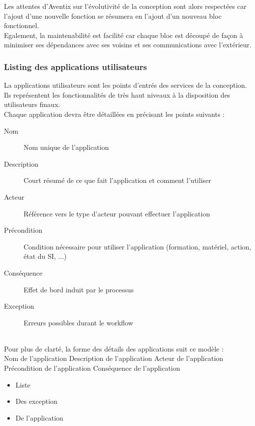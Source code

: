Les attentes d'Aventix sur l'évolutivité de la conception sont alors respectées
car l'ajout d'une nouvelle fonction se résumera en l'ajout d'un nouveau bloc
fonctionnel. \\

Egalement, la maintenabilité est facilité car chaque bloc est découpé de façon
à minimiser ses dépendances avec ses voisins et ses communications avec
l'extérieur. \\


\subsubsection{Listing des applications utilisateurs}
La applications utilisateurs sont les points d'entrés des services de la
conception. Ils représentent les fonctionnalités de très haut niveaux à la
disposition des utilisateurs finaux. \\

Chaque application devra être détaillées en précisant les points suivants :
\begin{description}
  \item[Nom] Nom unique de l'application
  \item[Description] Court résumé de ce que fait l'application et comment
    l'utiliser
  \item[Acteur] Référence vers le type d'acteur pouvant effectuer l'application
  \item[Précondition] Condition nécessaire pour utiliser l'application
    (formation, matériel, action, état du SI, ...)
  \item[Conséquence] Effet de bord induit par le processus
  \item[Exception] Erreurs possibles durant le workflow %
\end{description}

~\\
Pour plus de clarté, la forme des détails des applications suit ce modèle : \\

\CUBref
{Nom de l'application}
{Description de l'application}
{Acteur de l'application}
{Précondition de l'application}
{Conséquence de l'application}
{
  \begin{itemize}
    \item Liste
    \item Des exception
    \item De l'application
  \end{itemize}
}

